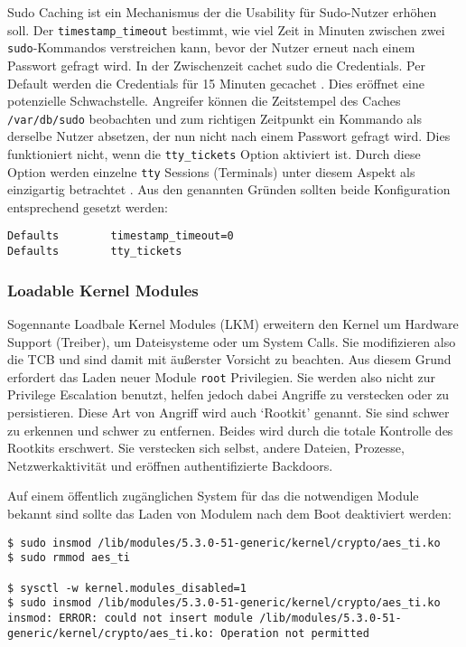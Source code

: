 Sudo Caching ist ein Mechanismus der die Usability für Sudo-Nutzer erhöhen soll. Der \texttt{timestamp\_timeout} bestimmt, wie viel Zeit in Minuten zwischen zwei \texttt{sudo}-Kommandos verstreichen kann, bevor der Nutzer erneut nach einem Passwort gefragt wird. In der Zwischenzeit cachet sudo die Credentials. Per Default werden die Credentials für 15 Minuten gecachet \cite{man-sudo}.
Dies eröffnet eine potenzielle Schwachstelle. Angreifer können die Zeitstempel des Caches \texttt{/var/db/sudo} beobachten und zum richtigen Zeitpunkt ein Kommando als derselbe Nutzer absetzen, der nun nicht nach einem Passwort gefragt wird. Dies funktioniert nicht, wenn die \texttt{tty\_tickets} Option aktiviert ist. Durch diese Option werden einzelne \texttt{tty} Sessions (Terminals) unter diesem Aspekt als einzigartig betrachtet \cite{attack-sudo-caching}.
Aus den genannten Gründen sollten beide Konfiguration entsprechend gesetzt werden:

\begin{lstlisting}
Defaults        timestamp_timeout=0
Defaults        tty_tickets 
\end{lstlisting}


\subsubsection{Loadable Kernel Modules}

Sogennante Loadbale Kernel Modules (LKM) erweitern den Kernel um Hardware Support (Treiber), um Dateisysteme oder um System Calls. Sie modifizieren also die TCB und sind damit mit äußerster Vorsicht zu beachten. Aus diesem Grund erfordert das Laden neuer Module \texttt{root} Privilegien. Sie werden also nicht zur Privilege Escalation benutzt, helfen jedoch dabei Angriffe zu verstecken oder zu persistieren. Diese Art von Angriff wird auch `Rootkit' genannt. Sie sind schwer zu erkennen
und schwer zu entfernen. Beides wird durch die totale Kontrolle des Rootkits erschwert. Sie verstecken sich selbst, andere Dateien, Prozesse, Netzwerkaktivität und eröffnen authentifizierte Backdoors. \cite{attack-rootkit, attack-lkm}

Auf einem öffentlich zugänglichen System für das die notwendigen Module bekannt sind sollte das Laden von Modulem nach dem Boot deaktiviert werden:

\begin{lstlisting}
$ sudo insmod /lib/modules/5.3.0-51-generic/kernel/crypto/aes_ti.ko
$ sudo rmmod aes_ti

$ sysctl -w kernel.modules_disabled=1
$ sudo insmod /lib/modules/5.3.0-51-generic/kernel/crypto/aes_ti.ko
insmod: ERROR: could not insert module /lib/modules/5.3.0-51-generic/kernel/crypto/aes_ti.ko: Operation not permitted
\end{lstlisting}

